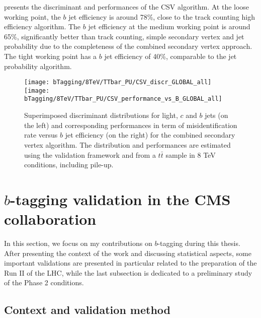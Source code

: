      presents the discriminant and performances of
    the CSV algorithm. At the loose working point, the $b$ jet efficiency is
    around 78\%, close to the track counting high efficiency algorithm. The $b$
    jet efficiency at the medium working point is around 65\%, significantly
    better than track counting, simple secondary vertex and jet probability due
    to the completeness of the combined secondary vertex approach. The tight
    working point has a $b$ jet efficiency of 40\%, comparable to the jet
    probability algorithm.

    \begin{figure}[th!]
        \centering
        \begin{minipage}{\textwidth}
        \texttt{[image: bTagging/8TeV/TTbar\_PU/CSV\_discr\_GLOBAL\_all]}
        \texttt{[image: bTagging/8TeV/TTbar\_PU/CSV\_performance\_vs\_B\_GLOBAL\_all]}
        \end{minipage}
        \caption{Superimposed discriminant distributions for light, $c$ and $b$
        jets (on the left) and corresponding performances in term of
        misidentification rate versus $b$ jet efficiency (on the right) for the
        combined secondary vertex algorithm.  The distribution and performances
        are estimated using the validation framework and from a $t\bar{t}$
        sample in 8 TeV conditions, including pile-up.}
        \label{fig:bTagging/perfCSV}
    \end{figure}

    \section{$b$-tagging validation in the CMS collaboration \label{sec:bTagValidation}}

    In this section, we focus on my contributions on $b$-tagging during this
    thesis.  After presenting the context of the work and discussing statistical
    aspects, some important validations are presented in particular related to
    the preparation of the Run II of the LHC, while the last subsection is
    dedicated to a preliminary study of the Phase 2 conditions.

        \subsection{Context and validation method}

